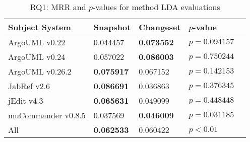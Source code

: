 
\begin{table}[t]
\renewcommand{\arraystretch}{1.3}
\footnotesize
\centering
\caption{RQ1: MRR and $p$-values for method LDA evaluations}
\begin{tabular}{l|ll|ll}
   \toprule
    Subject System & Snapshot & Changeset & $p$-value  \\
    \midrule

ArgoUML v0.22 & 0.044457 & {\bf 0.073552 } & $p = 0.094157$ \\
ArgoUML v0.24 & 0.057022 & {\bf 0.086003 } & $p = 0.750244$ \\
ArgoUML v0.26.2 & {\bf 0.075917 } & 0.067152 & $p = 0.142153$ \\
JabRef v2.6 & {\bf 0.086691 } & 0.036863 & $p = 0.376345$ \\
jEdit v4.3 & {\bf 0.065631 } & 0.049099 & $p = 0.448448$ \\
muCommander v0.8.5 & 0.037569 & {\bf 0.046009 } & $p = 0.031185$ \\
\midrule
All & {\bf 0.062533 } & 0.060422 & $p < 0.01$ \\

    \bottomrule
\end{tabular}
\label{table:rq1:method:lda}
\end{table}

